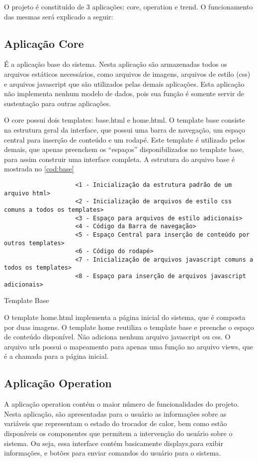 				O projeto é constituído de 3 aplicações: core, operation e trend. O funcionamento das mesmas será explicado a seguir:
			
			\subsection{Aplicação Core}
				É a aplicação base do sistema. Nesta aplicação são armazenadas todos os arquivos estáticos necessários, como arquivos de imagens, arquivos de estilo (css) e arquivos javascript que são utilizados pelas demais aplicações. Esta aplicação não implementa nenhum modelo de dados, pois sua função é somente servir de sustentação para outras aplicações.
				
				O core possui dois templates: base.html e home.html. O template base consiste na estrutura geral da interface, que possui uma barra de navegação, um espaço central para inserção de conteúdo e um rodapé. Este template é utilizado pelos demais, que apenas preenchem os ``espaços'' disponibilizados no template base, para assim construir uma interface completa. A estrutura do arquivo base é mostrada no \autoref{cod:base}
				
				\begin{listing}[!htb]
					\begin{verbatim}
					<1 - Inicialização da estrutura padrão de um arquivo html>
					<2 - Inicialização de arquivos de estilo css comuns a todos os templates>
					<3 - Espaço para arquivos de estilo adicionais>
					<4 - Código da Barra de navegação>
					<5 - Espaço Central para inserção de conteúdo por outros templates>
					<6 - Código do rodapé>
					<7 - Inicialização de arquivos javascript comuns a todos os templates>
					<8 - Espaço para inserção de arquivos javascript adicionais>
					\end{verbatim}
					\caption{Template Base}
					\label{cod:base}
				\end{listing}
				
				O template home.html implementa a página inicial do sistema, que é composta por duas imagens. O template home reutiliza o template base e preenche o espaço de conteúdo disponível. Não adiciona nenhum arquivo javascript ou css. O arquivo urls possui o mapeamento para apenas uma função no arquivo views, que é a chamada para a página inicial.
				
			\subsection{Aplicação Operation}
				A aplicação operation contém o maior número de funcionalidades do projeto. Nesta aplicação, são apresentadas para o usuário as informações sobre as variáveis que representam o estado do trocador de calor, bem como estão disponíveis os componentes que permitem a intervenção do usuário sobre o sistema. Ou seja, essa interface contém basicamente displays,para exibir informações, e botões para enviar comandos do usuário para o sistema.
				
